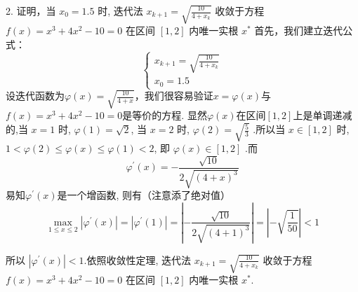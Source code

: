 \begin{tcolorbox}[breakable,
		colframe=white!10!jingga, coltitle=white!90!jingga, colback=white!95!jingga, coltext=black, colbacktitle=white!10!jingga, enhanced, fonttitle=\bfseries,fontupper=\normalsize, attach boxed title to top left={yshift=-2mm}, before skip=8pt, after skip=8pt,
		title=解答题]

2. 证明，当 $ x_{0}=1.5 $ 时, 迭代法 $ x_{k+1}=\sqrt{\frac{10}{4+x_{k}}} $ 收敛于方程 $ f(x)=x^{3}+4 x^{2}-10=0 $ 在区间 $ [1,2] $ 内唯一实根 $ x^{*} $
   \tcblower
首先，我们建立迭代公式：
$$
\left\{
\begin{array}{l}
x_{k+1}=\sqrt{\frac{10}{4+x_{k}}} \\
x_{0}=1.5
\end{array}
\right.
$$
设迭代函数为$\varphi(x)=\sqrt{\frac{10}{4+x}}$，我们很容易验证$x=\varphi(x)$与$f(x)=x^{3}+4x^{2}-10=0$是等价的方程.
显然$\varphi(x)$在区间$[1,2]$上是单调递减的,当 $ {x}=1 $ 时, $ \varphi(1)=\sqrt{2} $, 当 $ {x}=2 $ 时, $ \varphi(2)=\sqrt{\frac{5}{3}} $ .所以当 $ {x} \in[1,2] $ 时, $ 1<\varphi(2) \leqslant \varphi({x}) \leqslant \varphi(1)<2 $, 即 $ \varphi({x}) \in[1,2] $ .而
$$ \varphi ^{\prime}(x)=-\frac{\sqrt{10}}{2\sqrt{(4+x)^{3}}}$$
易知$ \varphi ^{\prime}(x)$是一个增函数, 则有（注意添了绝对值）
$$
\max _{1 \leqslant x \leqslant 2}\left|\varphi^{\prime}(x)\right|=|\varphi^{\prime}(1)|=\left|- \frac{\sqrt{10}}{2\sqrt{(4+1)^{3}}}\right|=\left|-\sqrt{\frac{1}{50}}\right|<1
$$

 所以 $|\varphi^{\prime}({x})|<1 $.依照收敛性定理, 迭代法 $ {x}_{{k}+1}=\sqrt{\frac{10}{4+{x}_{{k}}}} $ 收敛于方程 $ f(x)=x^{3}+4 x^{2}-10=0 $ 在区间 $ [1,2] $ 内唯一实根 $ x^{*} $.
\end{tcolorbox}


